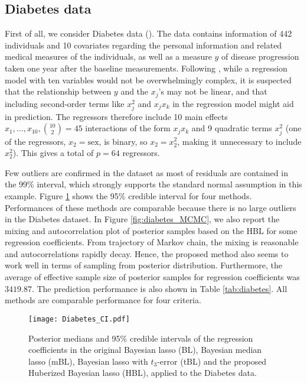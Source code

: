 \documentclass[11pt]{article}
\theoremstyle{plain}
\theoremstyle{definition}
\begin{document}
\subsection{Diabetes data}
\label{subsec:Diabetes}

First of all, we consider Diabetes data (\cite{EHJT04}). The data contains information of 442 individuals and 10 covariates regarding the personal information and related medical measures of the individuals, as well as a measure $y$ of
disease progression taken one year after the baseline measurements. Following \cite{HIS20},  while a regression model with ten
variables would not be overwhelmingly complex, it is suspected that
the relationship between $y$ and the $x_{j}$'s may not be linear,
and that including second-order terms like $x_{j}^{2}$ and
$x_{j}x_{k}$ in the regression model might aid in prediction. The
regressors therefore include 10 main effects $x_{1},
\dots, x_{10}, \binom{10}{2} =45$ interactions of the form $x_{j}x_{k}$ and 9 quadratic
terms $x_{j}^{2}$ (one of the regressors, $x_{2}= \mathrm{sex}$, is
binary, so $x_{2}=x_{2}^{2}$, making it unnecessary to include
$x_{2}^{2}$). This gives a total of $p=64$ regressors. 

Few outliers are confirmed in the dataset as most of residuals are contained in the 99\% interval, which strongly supports the standard normal assumption in this example. Figure \ref{fig:diabetes_CI} shows the 95\% credible interval for four methods. Performances of these methods are comparable because there is no large outliers in the Diabetes dataset. In Figure \ref{fig:diabetes_MCMC}, we also report the mixing and autocorrelation plot of posterior samples based on the HBL for some regression coefficients. From trajectory of Markov chain, the mixing is reasonable and autocorrelations rapidly decay. Hence, the proposed method also seems to work well in terms of sampling from posterior distribution.   Furthermore, the average of effective sample size of posterior samples for regression coefficients was $3419.87$. The prediction performance is also shown in Table \ref{tab:diabetes}. All methods are comparable performance for four criteria.

 
\begin{figure}[htbp]
\centering
\texttt{[image: Diabetes\_CI.pdf]}
\caption{Posterior medians and 95\% credible intervals of the regression coefficients in the original Bayesian lasso (BL), Bayesian median lasso (mBL), Bayesian lasso with $t_3$-error (tBL) and the proposed Huberized Bayesian lasso (HBL), applied to the Diabetes data.}
\label{fig:diabetes_CI}
\end{figure}
\end{document}
